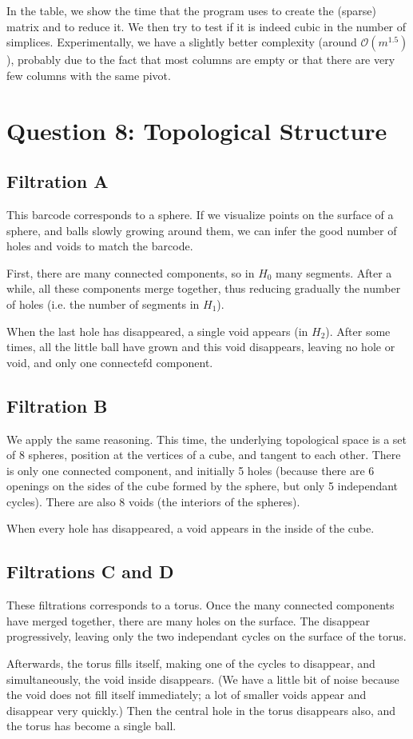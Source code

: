 \documentclass[a4paper,11pt,openany,extrafontsizes,oneside,article]{memoir}
\begin{document}
In the table, we show the time that the program uses to create the
(sparse) matrix and to reduce it. We then try to test if it is indeed
cubic in the number of simplices. Experimentally, we have a slightly
better complexity (around $\mathcal{O}(m^{1.5})$), probably due to the
fact that most columns are empty or that there are very few columns
with the same pivot.

\chapter{Question 8: Topological Structure}
\label{chap:q8}

\section{Filtration A}

This barcode corresponds to a sphere. If we visualize points on the
surface of a sphere, and balls slowly growing around them, we can
infer the good number of holes and voids to match the barcode.

First, there are many connected components, so in $H_0$ many
segments. After a while, all these components merge together, thus
reducing gradually the number of holes (i.e. the number of segments in
$H_1$).

When the last hole has disappeared, a single void appears (in
$H_2$). After some times, all the little ball have grown and this void
disappears, leaving no hole or void, and only one connectefd
component.

\section{Filtration B}

We apply the same reasoning. This time, the underlying topological
space is a set of 8 spheres, position at the vertices of a cube, and
tangent to each other. There is only one connected component, and
initially 5 holes (because there are 6 openings on the sides of the
cube formed by the sphere, but only 5 independant cycles). There are
also 8 voids (the interiors of the spheres).

When every hole has disappeared, a void appears in the inside of the
cube.

\section{Filtrations C and D}

These filtrations corresponds to a torus. Once the many connected
components have merged together, there are many holes on the
surface. The disappear progressively, leaving only the two independant
cycles on the surface of the torus.

Afterwards, the torus fills itself, making one of the cycles to
disappear, and simultaneously, the void inside disappears. (We have a
little bit of noise because the void does not fill itself immediately;
a lot of smaller voids appear and disappear very quickly.) Then the
central hole in the torus disappears also, and the torus has become a
single ball.
\end{document}
